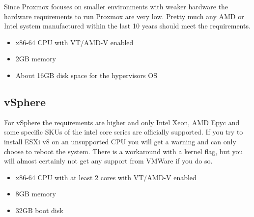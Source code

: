 Since Proxmox focuses on smaller environments with weaker hardware the hardware requirements to run Proxmox are very low. Pretty much any AMD or Intel system manufactured within the last 10 years should meet the requirements.

\begin{itemize}
	\item x86-64 CPU with VT/AMD-V enabled
	\item 2GB memory
	\item About 16GB disk space for the hypervisors OS
\end{itemize}

\subsection{vSphere}
For vSphere the requirements are higher and only Intel Xeon, AMD Epyc and some specific SKUs of the intel core series are officially supported. 
If you try to install ESXi v8 on an unsupported CPU you will get a warning and can only choose to reboot the system. There is a workaround with a kernel flag, but you will almost certainly not get any support from VMWare if you do so. 

\begin{itemize}
	\item x86-64 CPU with at least 2 cores with VT/AMD-V enabled
	\item 8GB memory
	\item 32GB boot disk
\end{itemize}